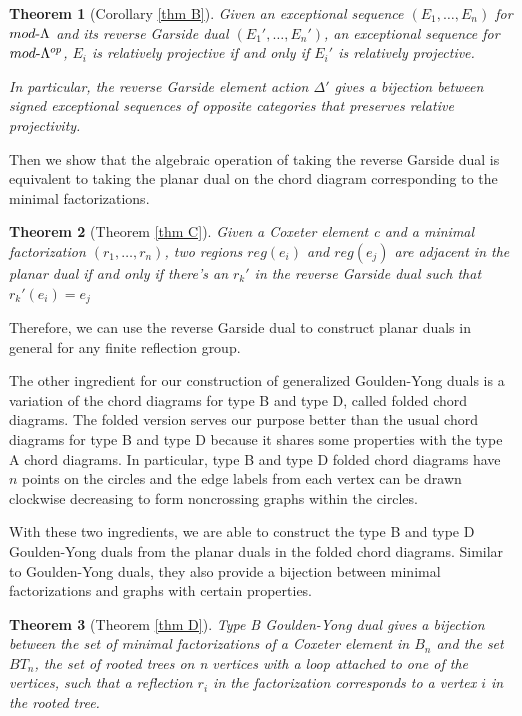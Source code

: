 \documentclass[11pt]{amsart}
\newtheorem{thm}{Theorem}[section]
\begin{document}
\begin{thm}[Corollary \ref{thm B}]
    Given an exceptional sequence $(E_1,\dots,E_n)$ for $mod\text-\Lambda$ and its reverse Garside dual $(E_1',\dots,E_n')$, an exceptional sequence for $mod\text-\Lambda^{op}$, $E_i$ is relatively projective if and only if $E_i'$ is relatively projective.

    In particular, the reverse Garside element action $\Delta'$ gives a bijection between signed exceptional sequences of opposite categories that preserves relative projectivity. 
\end{thm}

Then we show that the algebraic operation of taking the reverse Garside dual is equivalent to taking the planar dual on the chord diagram corresponding to the minimal factorizations.

\begin{thm}[Theorem \ref{thm C}]
    Given a Coxeter element c and a minimal factorization $(r_1,\dots,r_n)$, two regions $reg(e_i)$ and $reg(e_j)$ are adjacent in the planar dual if and only if there's an $r_k'$ in the reverse Garside dual such that $r_k'(e_i)=e_j$
\end{thm}

Therefore, we can use the reverse Garside dual to construct planar duals in general for any finite reflection group.

The other ingredient for our construction of generalized Goulden-Yong duals is a variation of the chord diagrams for type B and type D, called folded chord diagrams. The folded version serves our purpose better than the usual chord diagrams for type B and type D because it shares some properties with the type A chord diagrams. In particular, type B and type D folded chord diagrams have $n$ points on the circles and the edge labels from each vertex can be drawn clockwise decreasing to form noncrossing graphs within the circles.

With these two ingredients, we are able to construct the type B and type D Goulden-Yong duals from the planar duals in the folded chord diagrams. Similar to Goulden-Yong duals, they also provide a bijection between minimal factorizations and graphs with certain properties.

\begin{thm}[Theorem \ref{thm D}]
    Type B Goulden-Yong dual gives a bijection between the set of minimal factorizations of a Coxeter element in $B_n$ and the set $BT_n$, the set of rooted trees on n vertices with a loop attached to one of the vertices, such that a reflection $r_i$ in the factorization corresponds to a vertex $i$ in the rooted tree.
\end{thm}
\end{document}
